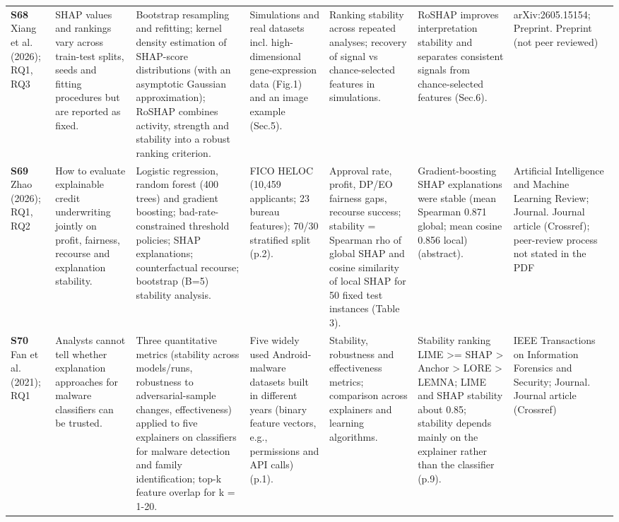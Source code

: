 \begin{longtable}{@{}P{1.55cm}P{2.9cm}P{4.5cm}P{3.2cm}P{3.4cm}P{4.6cm}P{3.6cm}@{}}
\textbf{S68} \cite{S68} Xiang et al. (2026); RQ1, RQ3 & SHAP values and rankings vary across train-test splits, seeds and fitting procedures but are reported as fixed. & Bootstrap resampling and refitting; kernel density estimation of SHAP-score distributions (with an asymptotic Gaussian approximation); RoSHAP combines activity, strength and stability into a robust ranking criterion. & Simulations and real datasets incl. high-dimensional gene-expression data (Fig.1) and an image example (Sec.5). & Ranking stability across repeated analyses; recovery of signal vs chance-selected features in simulations. & RoSHAP improves interpretation stability and separates consistent signals from chance-selected features (Sec.6). & arXiv:2605.15154; Preprint. Preprint (not peer reviewed) \\
\textbf{S69} \cite{S69} Zhao (2026); RQ1, RQ2 & How to evaluate explainable credit underwriting jointly on profit, fairness, recourse and explanation stability. & Logistic regression, random forest (400 trees) and gradient boosting; bad-rate-constrained threshold policies; SHAP explanations; counterfactual recourse; bootstrap (B=5) stability analysis. & FICO HELOC (10,459 applicants; 23 bureau features); 70/\allowbreak{}30 stratified split (p.2). & Approval rate, profit, DP/\allowbreak{}EO fairness gaps, recourse success; stability = Spearman rho of global SHAP and cosine similarity of local SHAP for 50 fixed test instances (Table 3). & Gradient-boosting SHAP explanations were stable (mean Spearman 0.871 global; mean cosine 0.856 local) (abstract). & Artificial Intelligence and Machine Learning Review; Journal. Journal article (Crossref); peer-review process not stated in the PDF \\
\textbf{S70} \cite{S70} Fan et al. (2021); RQ1 & Analysts cannot tell whether explanation approaches for malware classifiers can be trusted. & Three quantitative metrics (stability across models/\allowbreak{}runs, robustness to adversarial-sample changes, effectiveness) applied to five explainers on classifiers for malware detection and family identification; top-k feature overlap for k = 1-20. & Five widely used Android-malware datasets built in different years (binary feature vectors, e.g., permissions and API calls) (p.1). & Stability, robustness and effectiveness metrics; comparison across explainers and learning algorithms. & Stability ranking LIME \textgreater{}= SHAP \textgreater{} Anchor \textgreater{} LORE \textgreater{} LEMNA; LIME and SHAP stability about 0.85; stability depends mainly on the explainer rather than the classifier (p.9). & IEEE Transactions on Information Forensics and Security; Journal. Journal article (Crossref) \\

\end{longtable}
